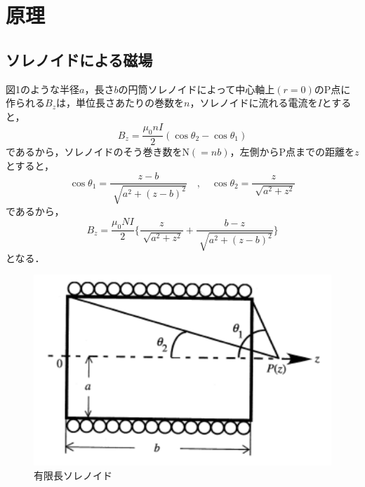 
\section{原理}

\subsection{ソレノイドによる磁場}
図1のような半径$a$，長さ$b$の円筒ソレノイドによって中心軸上$(r = 0)$のP点に
作られる$B_z$は，単位長さあたりの巻数を$n$，ソレノイドに流れる電流を$I$とすると，
$$
B_z=\frac{\mu_0 n I}{2}(\cos \theta_2 - \cos \theta_1)
$$
であるから，ソレノイドのそう巻き数をN$(=nb)$，左側からP点までの距離を$z$とすると，
$$
\cos \theta_1 = \frac{z-b}{\sqrt[]{a^2+(z-b)^2}}\quad,\quad \cos \theta_2 = \frac{z}{\sqrt[]{a^2+z^2}}
$$
であるから，
$$
B_z=\frac{\mu_0 NI}{2} \{ \frac{z}{\sqrt[]{a^2+z^2}} + \frac{b-z}{\sqrt[]{a^2+(z-b)^2}} \}
$$
となる．
\begin{figure}[!ht]
    \centering
    \includegraphics[scale=0.75]{figure1.pdf}
    \caption{有限長ソレノイド}
\end{figure}

